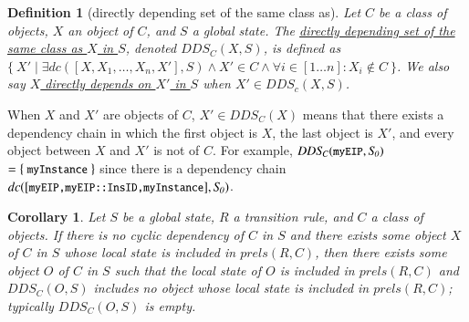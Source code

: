 \documentclass[12pt]{report}
\newtheorem{corollary}{Corollary}
\newtheorem{definition}{Definition}
\newcommand{\mbstt}[1]{\mbox{\small{\tt {#1}}}}
\newcommand{\ul}{\underline}
\begin{document}
\begin{definition}[directly depending set of the same class as]
Let $C$ be a class of objects, $X$ an object of $C$, and $S$ a
global state. The \ul{directly depending set of the same class as $X$
  in $S$}, denoted \ul{$\mathit{DDS_C}(X,S)$}, is defined as $\{~X'\mid\exists
dc([X,X_1,\dots,X_n,X'],S)\land X' \in C\land\forall i\in [1 \dots
  n]:X_i \not\in C~\}$. We also say \ul{$X$ directly depends on $X'$
  in $S$} when $X'\in \mathit{DDS_c}(X,S)$.
\end{definition}
When $X$ and $X'$ are objects of $C$, $X' \in \mathit{DDS_C}(X)$ means that
there exists a dependency chain in which the first object is $X$, the
last object is $X'$, and every object between $X$ and $X'$ is not of
$C$. For example, $\mathit{DDS_C}(\mbstt{myEIP},\mathit{S_0})$ $=\{~\mbstt{myInstance}~\}$
since there is a dependency chain
$dc([\mbstt{myEIP,myEIP::InsID,myInstance}],\mathit{S_0})$.

\begin{corollary}
Let $S$ be a global state, $R$ a transition rule, and $C$ a
class of objects. If there is no cyclic dependency of $C$ in $S$ and
there exists some object $X$ of $C$ in $S$ whose local state is
included in $prels(R,C)$, then there exists some object $O$ of $C$ in
$S$ such that the local state of $O$ is included in $prels(R,C)$ and
$\mathit{DDS_C}(O,S)$ includes no object whose local state is included in
$prels(R,C)$; typically $\mathit{DDS_C}(O,S)$ is empty.
\end{corollary}
\end{document}
